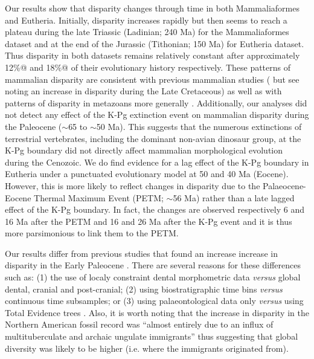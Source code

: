\documentclass[12pt,letterpaper]{article}
\begin{document}
Our results show that disparity changes through time in both Mammaliaformes and Eutheria.
Initially, disparity increases rapidly but then seems to reach a plateau during the late Triassic (Ladinian; 240 Ma) for the Mammaliaformes dataset and at the end of the Jurassic (Tithonian; 150 Ma) for Eutheria dataset.
Thus disparity in both datasets remains relatively constant after approximately 12\%@ and 18\%@ of their evolutionary history respectively.
These patterns of mammalian disparity are consistent with previous mammalian studies (\citealt{Close2015} but see \citealt{Grossnickle2013} noting an increase in disparity during the Late Cretaceous) as well as with patterns of disparity in metazoans more generally \citep{Hughes20082013}. %
Additionally, our analyses did not detect any effect of the K-Pg extinction event on mammalian disparity during the Paleocene ($\sim$65 to $\sim$50 Ma). %
This suggests that the numerous extinctions of terrestrial vertebrates, including the dominant non-avian dinosaur group, at the K-Pg boundary did not directly affect mammalian morphological evolution during the Cenozoic.
We do find evidence for a lag effect of the K-Pg boundary in Eutheria under a punctuated evolutionary model at 50 and 40 Ma (Eocene).
However, this is more likely to reflect changes in disparity due to the Palaeocene-Eocene Thermal Maximum Event (PETM; $\sim$56 Ma) rather than a late lagged effect of the K-Pg boundary.
In fact, the changes are observed respectively 6 and 16 Ma after the PETM and 16 and 26 Ma after the K-Pg event and it is thus more parsimonious to link them to the PETM.

Our results differ from previous studies that found an increase increase in disparity in the Early Paleocene \cite{Wilson2013}. %
There are several reasons for these differences such as: (1) the use of localy constraint dental morphometric data \textit{versus} global dental, cranial and post-cranial; (2) using biostratigraphic time bins \textit{versus} continuous time subsamples; or (3) using palaeontological data only \textit{versus} using Total Evidence trees \citep[][\textit{versus} this study]{Wilson2013}.
Also, it is worth noting that the increase in disparity in the Northern American fossil record was ``almost entirely due to an influx of multituberculate and archaic ungulate immigrants'' \citep{Wilson2013} thus suggesting that global diversity was likely to be higher (i.e. where the immigrants originated from).
\end{document}
